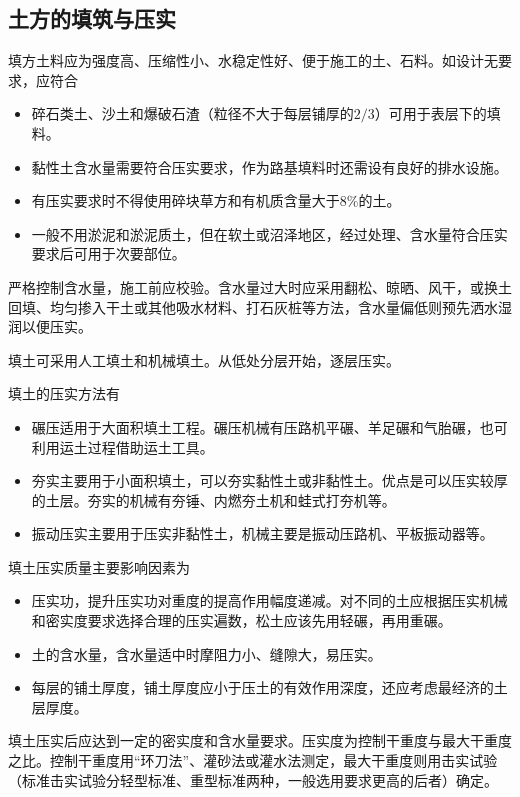 \documentclass{book}
\begin{document}
\subsection{土方的填筑与压实}
\par 填方土料应为强度高、压缩性小、水稳定性好、便于施工的土、石料。如设计无要求，应符合
\begin{itemize}
    \item 碎石类土、沙土和爆破石渣（粒径不大于每层铺厚的$2/3$）可用于表层下的填料。
    \item 黏性土含水量需要符合压实要求，作为路基填料时还需设有良好的排水设施。
    \item 有压实要求时不得使用碎块草方和有机质含量大于$8\%$的土。
    \item 一般不用淤泥和淤泥质土，但在软土或沼泽地区，经过处理、含水量符合压实要求后可用于次要部位。
\end{itemize}
\par 严格控制含水量，施工前应校验。含水量过大时应采用翻松、晾晒、风干，或换土回填、均匀掺入干土或其他吸水材料、打石灰桩等方法，含水量偏低则预先洒水湿润以便压实。
\par 填土可采用人工填土和机械填土。从低处分层开始，逐层压实。
\par 填土的压实方法有
\begin{itemize}
    \item 碾压适用于大面积填土工程。碾压机械有压路机平碾、羊足碾和气胎碾，也可利用运土过程借助运土工具。
    \item 夯实主要用于小面积填土，可以夯实黏性土或非黏性土。优点是可以压实较厚的土层。夯实的机械有夯锤、内燃夯土机和蛙式打夯机等。
    \item 振动压实主要用于压实非黏性土，机械主要是振动压路机、平板振动器等。
\end{itemize}
\par 填土压实质量主要影响因素为
\begin{itemize}
    \item 压实功，提升压实功对重度的提高作用幅度递减。对不同的土应根据压实机械和密实度要求选择合理的压实遍数，松土应该先用轻碾，再用重碾。
    \item 土的含水量，含水量适中时摩阻力小、缝隙大，易压实。
    \item 每层的铺土厚度，铺土厚度应小于压土的有效作用深度，还应考虑最经济的土层厚度。
\end{itemize}
\par 填土压实后应达到一定的密实度和含水量要求。压实度为控制干重度与最大干重度之比。控制干重度用“环刀法”、灌砂法或灌水法测定，最大干重度则用击实试验（标准击实试验分轻型标准、重型标准两种，一般选用要求更高的后者）确定。
\end{document}
